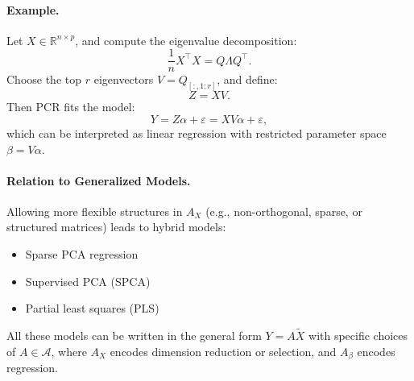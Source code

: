 \paragraph{Example.}
Let $X \in \mathbb{R}^{n \times p}$, and compute the eigenvalue decomposition:
\[
\frac{1}{n} X^\top X = Q \Lambda Q^\top.
\]
Choose the top $r$ eigenvectors $V = Q_{[:,1:r]}$, and define:
\[
Z = X V.
\]
Then PCR fits the model:
\[
Y = Z \alpha + \varepsilon = X V \alpha + \varepsilon,
\]
which can be interpreted as linear regression with restricted parameter space $\beta = V \alpha$.

\paragraph{Relation to Generalized Models.}
Allowing more flexible structures in $A_X$ (e.g., non-orthogonal, sparse, or structured matrices) leads to hybrid models:
\begin{itemize}
    \item Sparse PCA regression
    \item Supervised PCA (SPCA)
    \item Partial least squares (PLS)
\end{itemize}

All these models can be written in the general form $Y = A \tilde{X}$ with specific choices of $A \in \mathcal{A}$, where $A_X$ encodes dimension reduction or selection, and $A_\beta$ encodes regression.
